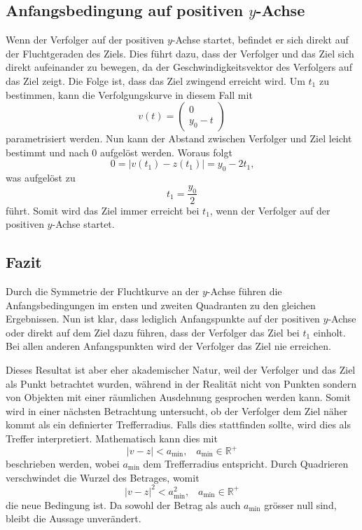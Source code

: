 \subsection{Anfangsbedingung auf positiven $y$-Achse}
Wenn der Verfolger auf der positiven $y$-Achse startet, befindet er sich direkt auf der Fluchtgeraden des Ziels.
Dies führt dazu, dass der Verfolger und das Ziel sich direkt aufeinander zu bewegen, da der Geschwindigkeitsvektor des Verfolgers auf das Ziel zeigt.
Die Folge ist, dass das Ziel zwingend erreicht wird.
Um $t_1$ zu bestimmen, kann die Verfolgungskurve in diesem Fall mit
%
\begin{equation}
    v(t)
    =
    \left( \begin{array}{c} 0 \\ y_0-t \end{array} \right)
\end{equation}
%
parametrisiert werden.
Nun kann der Abstand zwischen Verfolger und Ziel leicht bestimmt und nach 0 aufgelöst werden.
Woraus folgt
%
\begin{equation}
    0
    =
    |v(t_1)-z(t_1)|
    =
    y_0-2t_1\text{,}
\end{equation}
%
was aufgelöst zu
%
\begin{equation}
    t_1
    =
    \frac{y_0}{2}
\end{equation}
%
führt.
Somit wird das Ziel immer erreicht bei $t_1$, wenn der Verfolger auf der positiven $y$-Achse startet.
\subsection{Fazit}
Durch die Symmetrie der Fluchtkurve an der $y$-Achse führen die Anfangsbedingungen im ersten und zweiten Quadranten zu den gleichen Ergebnissen. Nun ist klar, dass lediglich Anfangspunkte auf der positiven $y$-Achse oder direkt auf dem Ziel dazu führen, dass der Verfolger das Ziel bei $t_1$ einholt.
Bei allen anderen Anfangspunkten wird der Verfolger das Ziel nie erreichen.

Dieses Resultat ist aber eher akademischer Natur, weil der Verfolger und das Ziel als Punkt betrachtet wurden, während in der Realität nicht von Punkten sondern von Objekten mit einer räumlichen Ausdehnung gesprochen werden kann.
Somit wird in einer nächsten Betrachtung untersucht, ob der Verfolger dem Ziel näher kommt als ein definierter Trefferradius.
Falls dies stattfinden sollte, wird dies als Treffer interpretiert.
Mathematisch kann dies mit
%
\begin{equation}
    |v-z|<a_{\text{min}} \text{,}\quad a_{\text{min}}\in\mathbb{R}^+
\end{equation}
%
beschrieben werden, wobei $a_{\text{min}}$ dem Trefferradius entspricht.
Durch Quadrieren verschwindet die Wurzel des Betrages, womit
%
\begin{equation}
    |v-z|^2<a_{\text{min}}^2 \text{,}\quad a_{\text{min}}\in \mathbb{R}^+
    \label{lambertw:minimumAbstand}
\end{equation}
%
die neue Bedingung ist.
Da sowohl der Betrag als auch $a_{\text{min}}$ grösser null sind, bleibt die Aussage unverändert.
%
